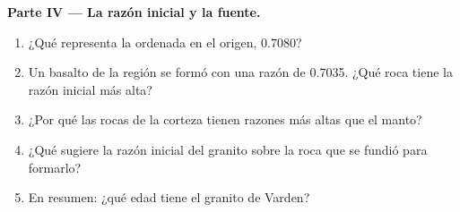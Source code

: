 \begin{problem}
\medskip
\noindent\textbf{Parte IV --- La razón inicial y la fuente.}
\begin{enumerate}[resume]
  \item ¿Qué representa la ordenada en el origen, 0.7080?
  \item Un basalto de la región se formó con una razón de 0.7035. ¿Qué roca
        tiene la razón inicial más alta?
  \item ¿Por qué las rocas de la corteza tienen razones más altas que el manto?
  \item ¿Qué sugiere la razón inicial del granito sobre la roca que se fundió
        para formarlo?
  \item En resumen: ¿qué edad tiene el granito de Varden?
\end{enumerate}
\end{problem}
